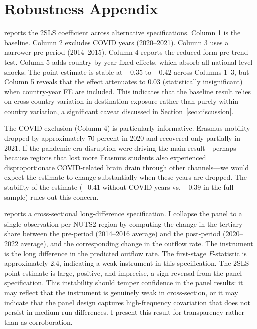 \documentclass[12pt]{article}
\begin{document}
\section{Robustness Appendix}
\label{sec:app_robustness}

\begin{table}[H]
\centering
\caption{Robustness: Alternative Specifications}
\label{tab:robustness}

\end{table}

 reports the 2SLS coefficient across alternative specifications. Column 1 is the baseline. Column 2 excludes COVID years (2020--2021). Column 3 uses a narrower pre-period (2014--2015). Column 4 reports the reduced-form pre-trend test. Column 5 adds country-by-year fixed effects, which absorb all national-level shocks. The point estimate is stable at $-0.35$ to $-0.42$ across Columns 1--3, but Column 5 reveals that the effect attenuates to 0.03 (statistically insignificant) when country-year FE are included. This indicates that the baseline result relies on cross-country variation in destination exposure rather than purely within-country variation, a significant caveat discussed in Section~\ref{sec:discussion}.

The COVID exclusion (Column 4) is particularly informative. Erasmus mobility dropped by approximately 70 percent in 2020 and recovered only partially in 2021. If the pandemic-era disruption were driving the main result---perhaps because regions that lost more Erasmus students also experienced disproportionate COVID-related brain drain through other channels---we would expect the estimate to change substantially when these years are dropped. The stability of the estimate ($-0.41$ without COVID years vs. $-0.39$ in the full sample) rules out this concern.

\begin{table}[H]
\centering
\caption{Cross-Sectional Long Difference}
\label{tab:cross_section}

\end{table}

 reports a cross-sectional long-difference specification. I collapse the panel to a single observation per NUTS2 region by computing the change in the tertiary share between the pre-period (2014--2016 average) and the post-period (2020--2022 average), and the corresponding change in the outflow rate. The instrument is the long difference in the predicted outflow rate. The first-stage $F$-statistic is approximately 2.4, indicating a weak instrument in this specification. The 2SLS point estimate is large, positive, and imprecise, a sign reversal from the panel specification. This instability should temper confidence in the panel results: it may reflect that the instrument is genuinely weak in cross-section, or it may indicate that the panel design captures high-frequency covariation that does not persist in medium-run differences. I present this result for transparency rather than as corroboration.
\end{document}
